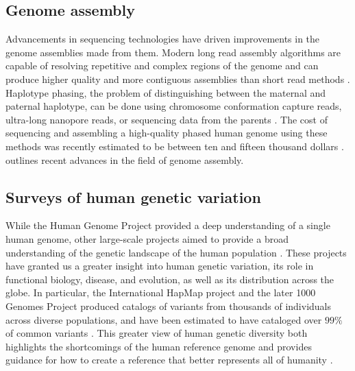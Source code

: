 \documentclass[11pt]{ucscthesis}
\begin{document}



\subsection{Genome assembly}

Advancements in sequencing technologies have driven improvements in the genome assemblies made from them.
Modern long read assembly algorithms are capable of resolving repetitive and complex regions of the genome and can produce higher quality and more contiguous assemblies than short read methods \cite{cheng_hifiasm_2021,rautiainen_verkko_2023,shafin_shasta_2020}.
Haplotype phasing, the problem of distinguishing between the maternal and paternal haplotype, can be done using chromosome conformation capture reads, ultra-long nanopore reads, or sequencing data from the parents \cite{cheng_hifiasm_2021}.
The cost of sequencing and assembling a high-quality phased human genome using these methods was recently estimated to be between ten and fifteen thousand dollars \cite{miga_envisioning_2023}.
\citet{li_assembly_2024} outlines recent advances in the field of genome assembly.

\subsection{Surveys of human genetic variation}

While the Human Genome Project provided a deep understanding of a single human genome, other large-scale projects aimed to provide a broad understanding of the genetic landscape of the human population \cite{international_hapmap_consortium_international_2003,international2005haplotype,1000_genomes_project_consortium_map_2010,1000gp_2015,chaisson_sv_2019}.
These projects have granted us a greater insight into human genetic variation, its role in functional biology, disease, and evolution, as well as its distribution across the globe.
In particular, the International HapMap project \cite{international_hapmap_consortium_international_2003,international2005haplotype} and the later 1000 Genomes Project \cite{1000_genomes_project_consortium_map_2010,1000gp_2015} produced catalogs of variants from thousands of individuals across diverse populations, and have been estimated to have cataloged over $99\%$ of common variants \cite{miga_need_pangenome_2021}.
This greater view of human genetic diversity both highlights the shortcomings of the human reference genome and provides guidance for how to create a reference that better represents all of humanity \cite{ballouz_is_2019,miga_need_pangenome_2021}.
\end{document}

